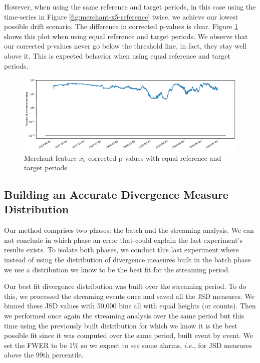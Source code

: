 \documentclass[sigconf]{acmart}
\begin{document}
However, when using the same reference and target periods, in this case using the time-series in Figure \ref{fig:merchant-x5-reference} twice, we achieve our lowest possible drift scenario. The difference in corrected p-values is clear. Figure \ref{fig:merchant2-x5-correctedpvalues} shows this plot when using equal reference and target periods. We observe that our corrected p-values never go below the threshold line, in fact, they stay well above it. This is expected behavior when using equal reference and target periods.
\begin{figure}[!htb]
    \begin{center}
      \includegraphics[scale=0.25]{figures/merchant2-x5-correctedpvalues.pdf}
      \caption{Merchant feature $x_5$ corrected p-values with equal reference and target periods}
      \label{fig:merchant2-x5-correctedpvalues}
    \end{center}
\end{figure}


\subsection{Building an Accurate Divergence Measure Distribution}
Our method comprises two phases: the batch and the streaming analysis. We can not conclude in which phase an error that could explain the last experiment's results exists. To isolate both phases, we conduct this last experiment where instead of using the distribution of divergence measures built in the batch phase we use a distribution we know to be the best fit for the streaming period. 

Our best fit divergence distribution was built over the streaming period. To do this, we processed the streaming events once and saved all the JSD measures. We binned these JSD values with 50,000 bins all with equal heights (or counts). Then we performed once again the streaming analysis over the same period but this time using the previously built distribution for which we know it is the best possible fit since it was computed over the same period, built event by event. We set the FWER to be 1\% so we expect to see some alarms, \textit{i.e.}, for JSD measures above the 99th percentile.
\end{document}
